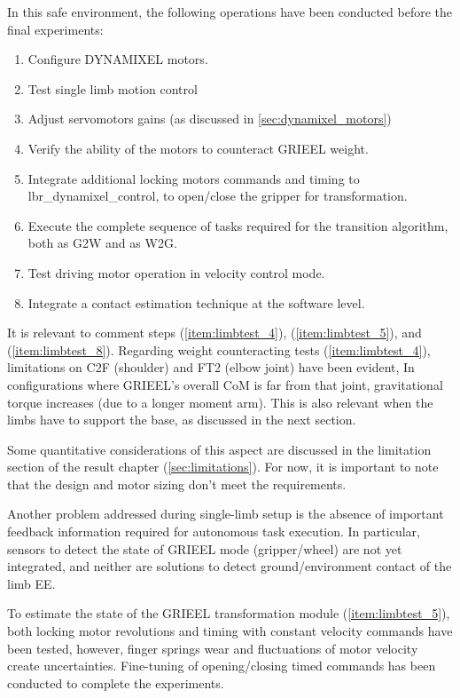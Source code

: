 In this safe environment, the following operations have been conducted before the final experiments: 
\begin{enumerate}
    \setlength\itemsep{-0.7em} 
    \item\label{item:limbtest_1} Configure DYNAMIXEL motors.
    \item\label{item:limbtest_2} Test single limb motion control
    \item\label{item:limbtest_3} Adjust servomotors gains (as discussed in \ref{sec:dynamixel_motors})
    \item\label{item:limbtest_4} Verify the ability of the motors to counteract GRIEEL weight.
    \item\label{item:limbtest_5} Integrate additional locking motors commands and timing to lbr\_dynamixel\_control, to open/close the gripper for transformation.
    \item\label{item:limbtest_6} Execute the complete sequence of tasks required for the transition algorithm, both as G2W and as W2G.
    \item\label{item:limbtest_7} Test driving motor operation in velocity control mode.
    \item\label{item:limbtest_8} Integrate a contact estimation technique at the software level.
\end{enumerate}

It is relevant to comment steps (\ref{item:limbtest_4}), (\ref{item:limbtest_5}), and (\ref{item:limbtest_8}).
Regarding weight counteracting tests (\ref{item:limbtest_4}), limitations on C2F (shoulder) and FT2 (elbow joint) have been evident, In configurations where GRIEEL's overall CoM is far from that joint, gravitational torque increases (due to a longer moment arm). 
This is also relevant when the limbs have to support the base, as discussed in the next section.

Some quantitative considerations of this aspect are discussed in the limitation section of the result chapter (\ref{sec:limitations}). For now, it is important to note that the design and motor sizing don't meet the requirements.

Another problem addressed during single-limb setup is the absence of important feedback information required for autonomous task execution. 
In particular, sensors to detect the state of GRIEEL mode (gripper/wheel) are not yet integrated, and neither are solutions to detect ground/environment contact of the limb EE. 

To estimate the state of the GRIEEL transformation module (\ref{item:limbtest_5}), both locking motor revolutions and timing with constant velocity commands have been tested, however, finger springs wear and fluctuations of motor velocity create uncertainties. Fine-tuning of opening/closing timed commands has been conducted to complete the experiments. 

